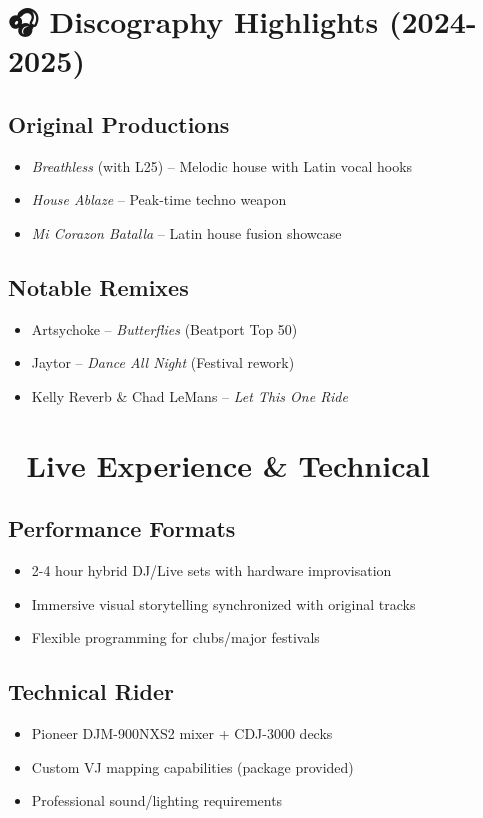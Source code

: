 \documentclass{article}
\newcommand{\subsectionrule}{\par\noindent{\color{secondary!15}\rule{\textwidth}{0.5pt}}\vspace{-1em}}
\begin{document}
\section*{\color{primary}🎧 Discography Highlights (2024-2025)}
\subsectionrule
\subsection*{Original Productions}
\begin{itemize}
\item \textit{Breathless} (with L25) – Melodic house with Latin vocal hooks
\item \textit{House Ablaze} – Peak-time techno weapon
\item \textit{Mi Corazon Batalla} – Latin house fusion showcase
\end{itemize}

\subsection*{Notable Remixes}
\begin{itemize}
\item Artsychoke – \textit{Butterflies} (Beatport Top 50)
\item Jaytor – \textit{Dance All Night} (Festival rework)
\item Kelly Reverb \& Chad LeMans – \textit{Let This One Ride}
\end{itemize}

\section*{\color{primary}🎪 Live Experience \& Technical}
\subsectionrule
\subsection*{Performance Formats}
\begin{itemize}
\item 2-4 hour hybrid DJ/Live sets with hardware improvisation
\item Immersive visual storytelling synchronized with original tracks
\item Flexible programming for clubs/major festivals
\end{itemize}

\subsection*{Technical Rider}
\begin{itemize}
\item Pioneer DJM-900NXS2 mixer + CDJ-3000 decks
\item Custom VJ mapping capabilities (package provided)
\item Professional sound/lighting requirements
\end{itemize}
\end{document}
